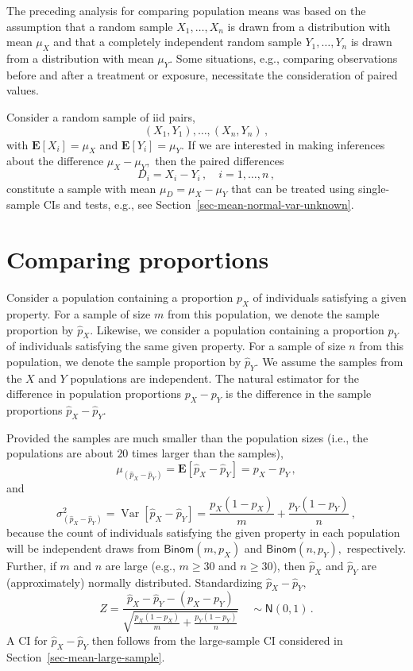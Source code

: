 \documentclass[
  a4paper,
  DIV=11,
  numbers=noendperiod,
  oneside]{scrreprt}
\theoremstyle{plain}
\theoremstyle{definition}
\theoremstyle{definition}
\theoremstyle{definition}
\theoremstyle{plain}
\theoremstyle{remark}
\begin{document}
The preceding analysis for comparing population means was based on the
assumption that a random sample \(X_1, \dots, X_n\) is drawn from a
distribution with mean \(\mu_X\) and that a completely independent
random sample \(Y_1, \dots, Y_n\) is drawn from a distribution with mean
\(\mu_Y.\) Some situations, e.g., comparing observations before and
after a treatment or exposure, necessitate the consideration of paired
values.

Consider a random sample of iid pairs, \[
(X_1, Y_1), \dots, (X_n, Y_n)\,,
\] with \(\mathbf{E}[X_i] = \mu_X\) and \(\mathbf{E}[Y_i] = \mu_Y.\) If
we are interested in making inferences about the difference
\(\mu_X - \mu_Y,\) then the paired differences \[
D_i = X_i - Y_i \,,\quad  i=1, \dots, n\,,
\] constitute a sample with mean \(\mu_D = \mu_X - \mu_Y\) that can be
treated using single-sample CIs and tests, e.g., see
Section~\ref{sec-mean-normal-var-unknown}.

\section{Comparing proportions}\label{sec-compare-proportions}

Consider a population containing a proportion \(p_X\) of individuals
satisfying a given property. For a sample of size \(m\) from this
population, we denote the sample proportion by \(\widehat{p}_X.\)
Likewise, we consider a population containing a proportion \(p_Y\) of
individuals satisfying the same given property. For a sample of size
\(n\) from this population, we denote the sample proportion by
\(\widehat{p}_Y.\) We assume the samples from the \(X\) and \(Y\)
populations are independent. The natural estimator for the difference in
population proportions \(p_X - p_Y\) is the difference in the sample
proportions \(\widehat{p}_X - \widehat{p}_Y.\)

Provided the samples are much smaller than the population sizes (i.e.,
the populations are about \(20\) times larger than the samples), \[
 \mu_{(\widehat{p}_X - \widehat{p}_Y)} = \mathbf{E}[\widehat{p}_X - \widehat{p}_Y] = p_X - p_Y\,,
\] and \[
 \sigma_{(\widehat{p}_X - \widehat{p}_Y)}^2 = \mathop{\mathrm{Var}}[\widehat{p}_X - \widehat{p}_Y] 
 = \frac{p_X(1-p_X)}{m} + \frac{p_Y(1-p_Y)}{n}\,,
\] because the count of individuals satisfying the given property in
each population will be independent draws from
\(\mathsf{Binom}(m, p_X)\) and \(\mathsf{Binom}(n, p_Y),\) respectively.
Further, if \(m\) and \(n\) are large (e.g., \(m \geq 30\) and
\(n \geq 30\)), then \(\widehat{p}_X\) and \(\widehat{p}_Y\) are
(approximately) normally distributed. Standardizing
\(\widehat{p}_X - \widehat{p}_Y,\) \[
 Z = \frac{\widehat{p}_X - \widehat{p}_Y - (p_X - p_Y)}{\sqrt{\frac{p_X(1-p_X)}{m} + \frac{p_Y(1-p_Y)}{n}}}
 \quad \sim \mathsf{N}(0,1)\,.
\] A CI for \(\widehat{p}_X - \widehat{p}_Y\) then follows from the
large-sample CI considered in Section~\ref{sec-mean-large-sample}.
\end{document}
